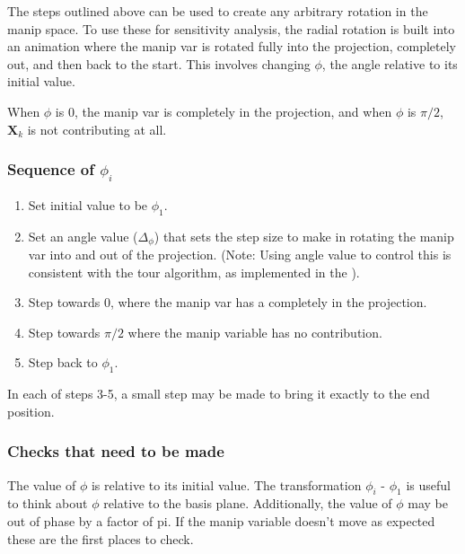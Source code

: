 The steps outlined above can be used to create any arbitrary rotation in
the manip space. To use these for sensitivity analysis, the radial
rotation is built into an animation where the manip var is rotated fully
into the projection, completely out, and then back to the start. This
involves changing \(\phi\), the angle relative to its initial value.

When \(\phi\) is 0, the manip var is completely in the projection, and
when \(\phi\) is \(\pi/2\), \(\textbf{X}_k\) is not contributing at all.

\hypertarget{sequence-of-phi_i}{%
\subsubsection{\texorpdfstring{Sequence of
\(\phi_i\)}{Sequence of \textbackslash phi\_i}}\label{sequence-of-phi_i}}

\begin{enumerate}
\def\labelenumi{\arabic{enumi}.}
\tightlist
\item
  Set initial value to be \(\phi_1\).
\item
  Set an angle value (\(\Delta_\phi\)) that sets the step size to make
  in rotating the manip var into and out of the projection. (Note: Using
  angle value to control this is consistent with the tour algorithm, as
  implemented in the ).
\item
  Step towards \(0\), where the manip var has a completely in the
  projection.
\item
  Step towards \(\pi/2\) where the manip variable has no contribution.
\item
  Step back to \(\phi_1\).
\end{enumerate}

In each of steps 3-5, a small step may be made to bring it exactly to
the end position.

\hypertarget{checks-that-need-to-be-made}{%
\subsubsection{Checks that need to be
made}\label{checks-that-need-to-be-made}}

The value of \(\phi\) is relative to its initial value. The
transformation \(\phi_i\) - \(\phi_1\) is useful to think about \(\phi\)
relative to the basis plane. Additionally, the value of \(\phi\) may be
out of phase by a factor of pi. If the manip variable doesn't move as
expected these are the first places to check.

